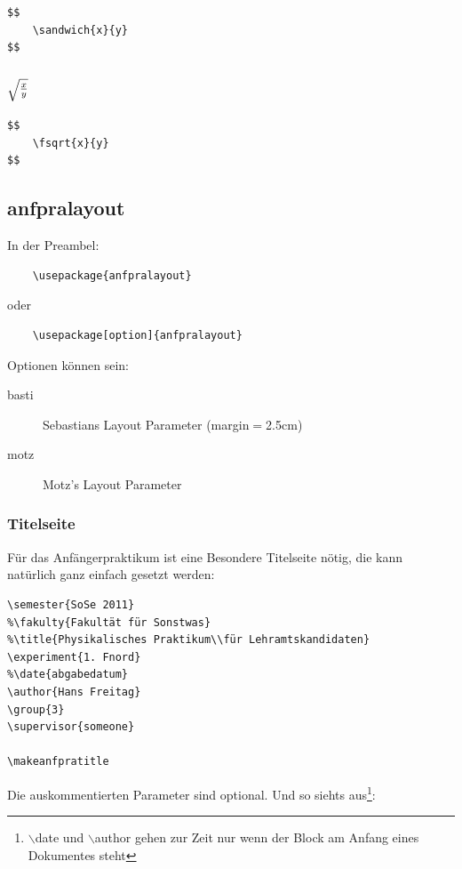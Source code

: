 \documentclass[a4paper]{article}
\begin{document}
\begin{verbatim}
$$
	\sandwich{x}{y}
$$
\end{verbatim}

\subsubsection{$ \sqrt{\frac{x}{y}}$}

\begin{verbatim}
$$
	\fsqrt{x}{y}
$$
\end{verbatim}



\subsection{anfpralayout}

In der Preambel:

\begin{verbatim}
	\usepackage{anfpralayout}
\end{verbatim}

oder

\begin{verbatim}
	\usepackage[option]{anfpralayout}
\end{verbatim}

Optionen können sein: 

\begin{description}
	\item[basti] Sebastians Layout Parameter (margin$=$2.5cm)
	\item[motz] Motz's Layout Parameter
\end{description}
	

\subsubsection{Titelseite}

Für das Anfängerpraktikum ist eine Besondere Titelseite nötig, die 
kann natürlich ganz einfach gesetzt werden:

\begin{verbatim}
\semester{SoSe 2011}
%\fakulty{Fakultät für Sonstwas}
%\title{Physikalisches Praktikum\\für Lehramtskandidaten}
\experiment{1. Fnord}
%\date{abgabedatum}
\author{Hans Freitag}
\group{3}
\supervisor{someone}

\makeanfpratitle
\end{verbatim}

Die auskommentierten Parameter sind optional. Und so siehts 
aus\footnote{$\backslash$date und $\backslash$author gehen zur Zeit nur wenn der Block am 
Anfang eines Dokumentes steht}:

\makeanfpratitle
\end{document}
